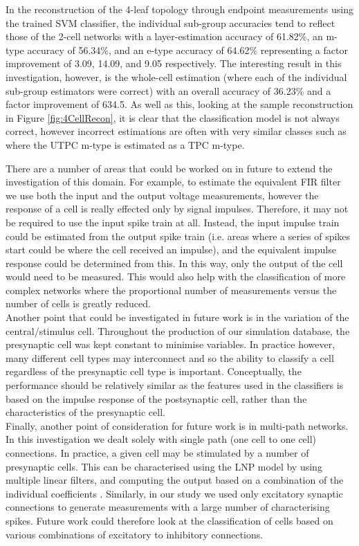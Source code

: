 \par

In the reconstruction of the 4-leaf topology through endpoint measurements using the trained SVM classifier, the individual sub-group accuracies tend to reflect those of the 2-cell networks with a layer-estimation accuracy of 61.82\%, an m-type accuracy of 56.34\%, and an e-type accuracy of 64.62\% representing a factor improvement of 3.09, 14.09, and 9.05 respectively. The interesting result in this investigation, however, is the whole-cell estimation (where each of the individual sub-group estimators were correct) with an overall accuracy of 36.23\% and a factor improvement of 634.5. As well as this, looking at the sample reconstruction in Figure \ref{fig:4CellRecon}, it is clear that the classification model is not always correct, however incorrect estimations are often with very similar classes such as where the UTPC m-type is estimated as a TPC m-type.

\par

There are a number of areas that could be worked on in future to extend the investigation of this domain. For example, to estimate the equivalent FIR filter we use both the input and the output voltage measurements, however the response of a cell is really effected only by signal impulses. Therefore, it may not be required to use the input spike train at all. Instead, the input impulse train could be estimated from the output spike train (i.e. areas where a series of spikes start could be where the cell received an impulse), and the equivalent impulse response could be determined from this. In this way, only the output of the cell would need to be measured. This would also help with the classification of more complex networks where the proportional number of measurements versus the number of cells is greatly reduced.\\
Another point that could be investigated in future work is in the variation of the central/stimulus cell. Throughout the production of our simulation database, the presynaptic cell was kept constant to minimise variables. In practice however, many different cell types may interconnect and so the ability to classify a cell regardless of the presynaptic cell type is important. Conceptually, the performance should be relatively similar as the features used in the classifiers is based on the impulse response of the postsynaptic cell, rather than the characteristics of the presynaptic cell.\\
Finally, another point of consideration for future work is in multi-path networks. In this investigation we dealt solely with single path (one cell to one cell) connections. In practice, a given cell may be stimulated by a number of presynaptic cells. This can be characterised using the LNP model by using multiple linear filters, and computing the output based on a combination of the individual coefficients \cite{lnp}. Similarly, in our study we used only excitatory synaptic connections to generate measurements with a large number of characterising spikes. Future work could therefore look at the classification of cells based on various combinations of excitatory to inhibitory connections.
